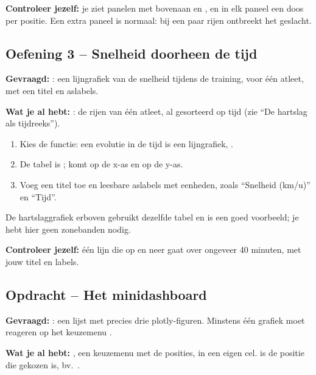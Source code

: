 \documentclass[11pt,a4paper]{article}
\begin{document}
\textbf{Controleer jezelf:} je ziet panelen met bovenaan
 en , en in elk paneel een doos per positie.
Een extra paneel  is normaal: bij een paar rijen
ontbreekt het geslacht.

\subsection*{Oefening 3 -- Snelheid doorheen de tijd}

\textbf{Gevraagd:} : een lijngrafiek van de snelheid
tijdens de training, voor één atleet, met een titel en aslabels.

\textbf{Wat je al hebt:} : de rijen van één atleet,
al gesorteerd op tijd (zie ``De hartslag als tijdreeks'').

\begin{enumerate}
  \item Kies de functie: een evolutie in de tijd is een lijngrafiek,
        .
  \item De tabel is ;  komt op de
        x-as en  op de y-as.
  \item Voeg een titel toe en leesbare aslabels met eenheden, zoals
        ``Snelheid (km/u)'' en ``Tijd''.
\end{enumerate}

De hartslaggrafiek erboven gebruikt dezelfde tabel en is een goed
voorbeeld; je hebt hier geen zonebanden nodig.

\textbf{Controleer jezelf:} één lijn die op en neer gaat over ongeveer
40 minuten, met jouw titel en labels.

\subsection*{Opdracht -- Het minidashboard}

\textbf{Gevraagd:} : een lijst met precies drie
plotly-figuren. Minstens één grafiek moet reageren op het keuzemenu
.

\textbf{Wat je al hebt:} , een keuzemenu met de
posities, in een eigen cel.  is de positie
die gekozen is, bv.\ .
\end{document}

